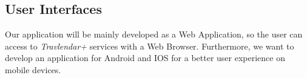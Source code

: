 \subsection{User Interfaces}
Our application will be mainly developed as a Web Application, so the user can access to \emph{Travlendar+} services with a Web Browser. Furthermore, we want to develop an application for Android and IOS for a better user experience on mobile devices.